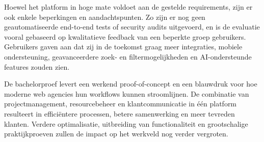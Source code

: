 Hoewel het platform in hoge mate voldoet aan de gestelde requirements, zijn er ook enkele beperkingen en aandachtspunten. Zo zijn er nog geen geautomatiseerde end-to-end tests of security audits uitgevoerd, en is de evaluatie vooral gebaseerd op kwalitatieve feedback van een beperkte groep gebruikers. Gebruikers gaven aan dat zij in de toekomst graag meer integraties, mobiele ondersteuning, geavanceerdere zoek- en filtermogelijkheden en AI-ondersteunde features zouden zien.

De bachelorproef levert een werkend proof-of-concept en een blauwdruk voor hoe moderne web agencies hun workflows kunnen stroomlijnen. De combinatie van projectmanagement, resourcebeheer en klantcommunicatie in één platform resulteert in efficiëntere processen, betere samenwerking en meer tevreden klanten. Verdere optimalisatie, uitbreiding van functionaliteit en grootschalige praktijkproeven zullen de impact op het werkveld nog verder vergroten.
